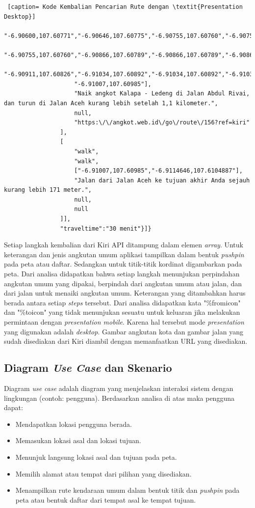 \begin{lstlisting} [caption= Kode Kembalian Pencarian Rute dengan \textit{Presentation Desktop}]
					"-6.90600,107.60771","-6.90646,107.60775","-6.90755,107.60760","-6.90755,107.60760",
					"-6.90755,107.60760","-6.90866,107.60789","-6.90866,107.60789","-6.90866,107.60789",
					"-6.90911,107.60826","-6.91034,107.60892","-6.91034,107.60892","-6.91034,107.60892",
					"-6.91007,107.60985"],
					"Naik angkot Kalapa - Ledeng di Jalan Abdul Rivai, dan turun di Jalan Aceh kurang lebih setelah 1,1 kilometer.",
					null,
					"https:\/\/angkot.web.id\/go\/route\/156?ref=kiri"
				],
				[
					"walk",
					"walk",
					["-6.91007,107.60985","-6.9114646,107.6104887"],
					"Jalan dari Jalan Aceh ke tujuan akhir Anda sejauh kurang lebih 171 meter.",
					null,
					null
				]],
				"traveltime":"30 menit"}]}
\end{lstlisting}

Setiap langkah kembalian dari Kiri API ditampung dalam elemen \textit{array}. Untuk keterangan dan jenis angkutan umum aplikasi tampilkan dalam bentuk \textit{pushpin} pada peta atau daftar. Sedangkan untuk titik-titik kordinat digambarkan pada peta. Dari analisa didapatkan bahwa setiap langkah menunjukan perpindahan angkutan umum yang dipakai, berpindah dari angkutan umum atau jalan, dan dari jalan untuk menaiki angkutan umum. Keterangan yang ditambahkan harus berada antara setiap \textit{steps} tersebut. Dari analisa didapatkan kata "\%fromicon" dan "\%toicon" yang tidak menunjukan sesuatu untuk keluaran jika melakukan permintaan dengan \textit{presentation mobile}. Karena hal tersebut mode \textit{presentation} yang digunakan adalah \textit{desktop}. Gambar angkutan kota dan gambar jalan yang sudah disediakan dari Kiri diambil dengan memanfaatkan URL yang disediakan. 

\subsection{Diagram \textit{Use Case} dan Skenario}
\label{lab:Diagram Use-Case dan Scenario}
\hspace{0.5cm} Diagram \textit{use case} adalah diagram yang menjelaskan interaksi sistem dengan lingkungan (contoh: pengguna). Berdasarkan analisa di atas maka pengguna dapat:
\begin{itemize}
	\item Mendapatkan lokasi pengguna berada.
	\item Memasukan lokasi asal dan lokasi tujuan.
	\item Menunjuk langsung lokasi asal dan tujuan pada peta.
	\item Memilih alamat atau tempat dari pilihan yang disediakan.
	\item Menampilkan rute kendaraan umum dalam bentuk titik dan \textit{pushpin} pada peta atau bentuk daftar dari tempat asal ke tempat tujuan.
\end{itemize}

